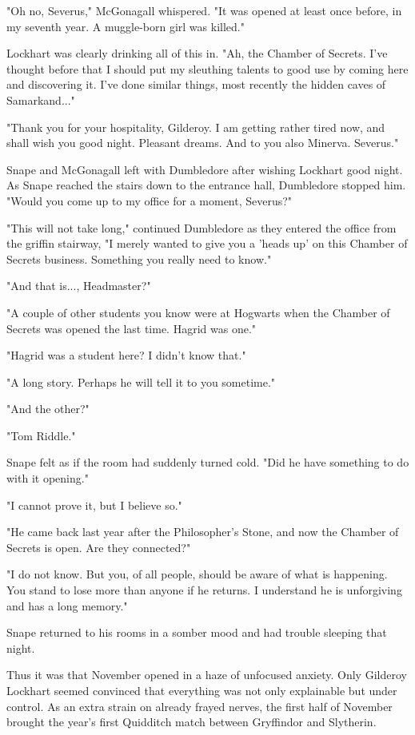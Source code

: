 \documentclass[a4paper,11pt]{article}
\begin{document}
"Oh no, Severus," McGonagall whispered. "It was opened at least once before, in my seventh year. A muggle-born girl was killed."

Lockhart was clearly drinking all of this in. "Ah, the Chamber of Secrets. I've thought before that I should put my sleuthing talents to good use by coming here and discovering it. I've done similar things, most recently the hidden caves of Samarkand..."

"Thank you for your hospitality, Gilderoy. I am getting rather tired now, and shall wish you good night. Pleasant dreams. And to you also Minerva. Severus."

Snape and McGonagall left with Dumbledore after wishing Lockhart good night. As Snape reached the stairs down to the entrance hall, Dumbledore stopped him. "Would you come up to my office for a moment, Severus?"

"This will not take long," continued Dumbledore as they entered the office from the griffin stairway, "I merely wanted to give you a 'heads up' on this Chamber of Secrets business. Something you really need to know."

"And that is..., Headmaster?"

"A couple of other students you know were at Hogwarts when the Chamber of Secrets was opened the last time. Hagrid was one."

"Hagrid was a student here? I didn't know that."

"A long story. Perhaps he will tell it to you sometime."

"And the other?"

"Tom Riddle."

Snape felt as if the room had suddenly turned cold. "Did he have something to do with it opening."

"I cannot prove it, but I believe so."

"He came back last year after the Philosopher's Stone, and now the Chamber of Secrets is open. Are they connected?"

"I do not know. But you, of all people, should be aware of what is happening. You stand to lose more than anyone if he returns. I understand he is unforgiving and has a long memory."

Snape returned to his rooms in a somber mood and had trouble sleeping that night.

Thus it was that November opened in a haze of unfocused anxiety. Only Gilderoy Lockhart seemed convinced that everything was not only explainable but under control. As an extra strain on already frayed nerves, the first half of November brought the year's first Quidditch match between Gryffindor and Slytherin.
\end{document}
